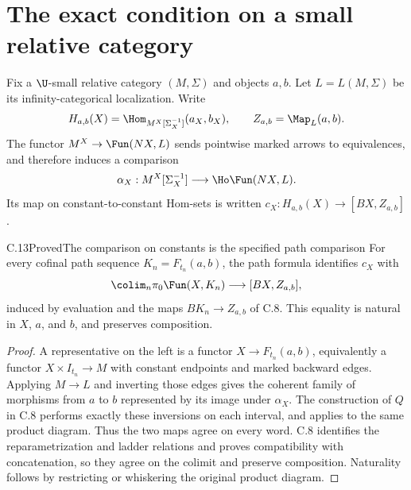 \section{The exact condition on a small relative category}

Fix a $\U$-small relative category $(M,\Sigma)$ and objects $a,b$. Let $L=L(M,\Sigma)$ be its infinity-categorical localization. Write
\[
 H_{a,b}(X)=\Hom_{M^X[\Sigma_X^{-1}]}(a_X,b_X),\qquad
 Z_{a,b}=\Map_L(a,b).
\]
The functor $M^X\to\Fun(NX,L)$ sends pointwise marked arrows to equivalences, and therefore induces a comparison
\[
 \alpha_X:M^X[\Sigma_X^{-1}]\longrightarrow\Ho\Fun(NX,L).
\]
Its map on constant-to-constant Hom-sets is written
$c_X:H_{a,b}(X)\to[BX,Z_{a,b}]$.

\begin{claim}{C.13}{Proved}{The comparison on constants is the specified path comparison}
For every cofinal path sequence $K_n=F_{t_n}(a,b)$, the path formula identifies $c_X$ with
\[
 \colim_n\pi_0\Fun(X,K_n)
 \longrightarrow[BX,Z_{a,b}],
\]
induced by evaluation and the maps $BK_n\to Z_{a,b}$ of C.8. This equality is natural in $X$, $a$, and $b$, and preserves composition.
\end{claim}
\begin{proof}
A representative on the left is a functor $X\to F_{t_n}(a,b)$, equivalently a functor $X\times I_{t_n}\to M$ with constant endpoints and marked backward edges. Applying $M\to L$ and inverting those edges gives the coherent family of morphisms from $a$ to $b$ represented by its image under $\alpha_X$. The construction of $Q$ in C.8 performs exactly these inversions on each interval, and applies to the same product diagram. Thus the two maps agree on every word. C.8 identifies the reparametrization and ladder relations and proves compatibility with concatenation, so they agree on the colimit and preserve composition. Naturality follows by restricting or whiskering the original product diagram.
\end{proof}

